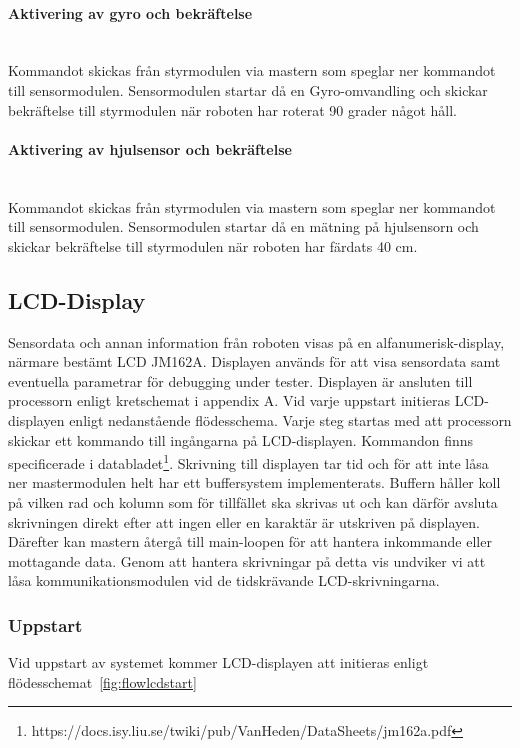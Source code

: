 \documentclass[a4paper,12pt,fleqn]{article}
\begin{document}
\paragraph{Aktivering av gyro och bekräftelse}
~\\
Kommandot skickas från styrmodulen via mastern som speglar ner kommandot till sensormodulen. Sensormodulen startar då en Gyro-omvandling och skickar bekräftelse till styrmodulen när roboten har roterat 90 grader något håll. 

\paragraph{Aktivering av hjulsensor och bekräftelse}
~\\
Kommandot skickas från styrmodulen via mastern som speglar ner kommandot till sensormodulen. Sensormodulen startar då en mätning på hjulsensorn och skickar bekräftelse till styrmodulen när roboten har färdats 40 cm. 

\subsection{LCD-Display}
Sensordata och annan information från roboten visas på en alfanumerisk-display, närmare bestämt LCD JM162A. Displayen används för att visa sensordata samt eventuella parametrar för debugging under tester. Displayen är ansluten till processorn enligt kretschemat i appendix A. 
Vid varje uppstart initieras LCD-displayen enligt nedanstående flödesschema. Varje steg startas med att processorn skickar ett kommando till ingångarna på LCD-displayen. Kommandon finns specificerade i databladet\footnote{https://docs.isy.liu.se/twiki/pub/VanHeden/DataSheets/jm162a.pdf}. Skrivning till displayen tar tid och för att inte låsa ner mastermodulen helt har ett buffersystem implementerats. Buffern håller koll på vilken rad och kolumn som för tillfället ska skrivas ut och kan därför avsluta skrivningen direkt efter att ingen eller en karaktär är utskriven på displayen. Därefter kan mastern återgå till main-loopen för att hantera inkommande eller mottagande data. Genom att hantera skrivningar på detta vis undviker vi att låsa kommunikationsmodulen vid de tidskrävande LCD-skrivningarna.

\subsubsection{Uppstart}
	
Vid uppstart av systemet kommer LCD-displayen att initieras enligt flödes\-schemat~\ref{fig:flowlcdstart}
\end{document}
